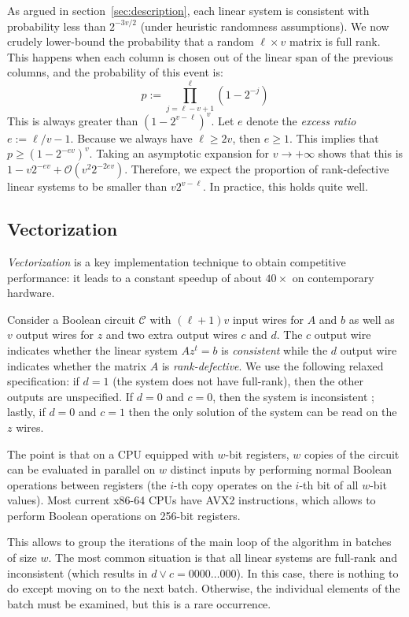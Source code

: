 \documentclass[a4paper,UKenglish,cleveref, autoref]{lipics-v2019}
\newcommand{\bigO}[1]{\ensuremath{\mathcal{O}\left( #1 \right)} }
\begin{document}
\medskip

As argued in section~\ref{sec:description}, each linear system is consistent
with probability less than $2^{-3v/2}$ (under heuristic randomness
assumptions). We now crudely lower-bound the probability that a random
$\ell \times v$ matrix is full rank. This happens when each column is chosen out
of the linear span of the previous columns, and the probability of this event
is:
\[
  p := \prod_{j=\ell-v+1}^\ell \left(1 - 2^{-j} \right)
\]
This is always greater than $\left(1 - 2^{v-\ell} \right)^v$. Let $e$ denote the
\emph{excess ratio} $e := \ell/v - 1$. Because we always have $\ell \geq 2v$,
then $e \geq 1$. This implies that $p \geq \left(1 - 2^{-ev} \right)^v$. Taking
an asymptotic expansion for $v \rightarrow +\infty$ shows that this is
$1 - v 2^{-ev} + \bigO{v^2 2^{-2ev}}$. Therefore, we expect the proportion of
rank-defective linear systems to be smaller than $v 2^{v-\ell}$. In practice,
this holds quite well.


\subsection{Vectorization}

\emph{Vectorization} is a key implementation technique to obtain competitive
performance: it leads to a constant speedup of about $40 \times$ on contemporary
hardware.

Consider a Boolean circuit $\mathcal{C}$ with $(\ell+1)v$ input wires for $A$
and $b$ as well as $v$ output wires for $z$ and two extra output wires $c$ and
$d$. The $c$ output wire indicates whether the linear system $A z^t = b$ is
\emph{consistent} while the $d$ output wire indicates whether the matrix $A$ is
\emph{rank-defective}. We use the following relaxed specification: if $d=1$ (the
system does not have full-rank), then the other outputs are unspecified. If
$d=0$ and $c=0$, then the system is inconsistent ; lastly, if $d=0$ and $c=1$
then the only solution of the system can be read on the $z$ wires.

The point is that on a CPU equipped with $w$-bit registers, $w$ copies of the
circuit can be evaluated in parallel on $w$ distinct inputs by performing normal
Boolean operations between registers (the $i$-th copy operates on the $i$-th bit
of all $w$-bit values). Most current \textsf{x86-64} CPUs have \textsf{AVX2}
instructions, which allows to perform Boolean operations on 256-bit registers.

This allows to group the iterations of the main loop of the algorithm in batches
of size $w$. The most common situation is that all linear systems are full-rank
and inconsistent (which results in $d \vee c = 0000 \dots 000$). In this case,
there is nothing to do except moving on to the next batch. Otherwise, the
individual elements of the batch must be examined, but this is a rare occurrence.
\end{document}
